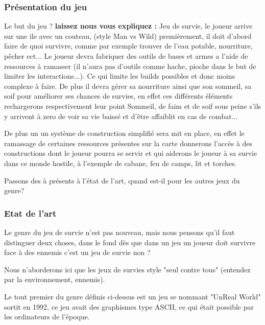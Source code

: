 \documentclass{article}
\begin{document}
\subsubsection{Présentation du jeu}
\par 
Le but du jeu ? \textbf{laissez nous  vous expliquez : } 
Jeu de survie, le joueur arrive sur une ile avec un couteau, (style Man vs Wild) premièrement, il doit d'abord faire de quoi survivre, comme par exemple trouver  de l'eau potable, nourriture, pêcher ect...  Le joueur devra fabriquer des outils de bases et armes a l’aide de ressources à ramasser (il n'aura pas d’outils  comme hache, pioche dans le but de limiter les interactions...). Ce qui limite les builds possibles et donc moins complexe à faire. De plus il devra gérer sa nourriture ainsi que son sommeil, sa soif pour améliorer ses chances de survies, en effet ces différents éléments rechargerons respectivement leur point Sommeil, de faim et de soif sous peine s'ils y arrivent à zero de voir sa vie baissé et d'être affaiblit en cas de combat...
\newline
\par 
De plus un un système de construction simplifié sera mit en place, en effet le ramassage de certaines ressources présentes sur la carte donnerons l'accès à des constructions dont le joueur pourra se servir et qui aiderons le joueur à sa survie dans ce monde hostile, à l'exemple de cabane, feu de camps, lit et torches.
\newline
 

\par
Passons des à présents à l'état de l'art, quand est-il pour les autres jeux du genre?
\newline

\subsubsection{Etat de l'art}

\par  
Le genre du jeu de survie n'est pas nouveau, mais nous pensons qu'il faut distinguer deux choses, dans le fond dès que dans un jeu un joueur doit survivre face à des ennemis c'est un jeu de survie non ? 

Nous  n'aborderons ici que les jeux de survies style "seul contre tous" (entendez par la environnement, ennemis).
\newline

\par 
Le tout premier du genre définis ci-dessus est un jeu se nommant "UnReal World" sortit en 1992, ce jeu avait des graphismes type ASCII, ce qui était possible par les ordinateurs de l'époque.
\newline
\vspace*{0.5cm}
\end{document}
